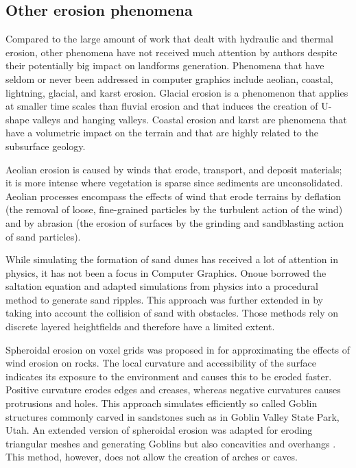\documentclass{article}
\begin{document}
\subsection{Other erosion phenomena}

Compared to the large amount of work that dealt with hydraulic and thermal erosion, other phenomena have not received much attention by authors despite their potentially big impact on landforms generation. Phenomena that have seldom or never been addressed in computer graphics include aeolian, coastal, lightning, glacial, and karst erosion. Glacial erosion is a phenomenon that applies at smaller time scales than fluvial erosion and that induces the creation of U-shape valleys and hanging valleys. Coastal erosion and karst are phenomena that have a volumetric impact on the terrain and that are highly related to the subsurface geology.

Aeolian erosion is caused by winds that erode, transport, and deposit materials; it is more intense where vegetation is sparse since sediments are unconsolidated. Aeolian processes encompass the effects of wind that erode terrains by deflation (the removal of loose, fine-grained particles by the turbulent action of the wind) and by abrasion (the erosion of surfaces by the grinding and sandblasting action of sand particles).

While simulating the formation of sand dunes has received a lot of attention in physics, it has not been a focus in Computer Graphics. Onoue \cite{ON00} borrowed the saltation equation and adapted simulations from physics into a procedural method to generate sand ripples. This approach was further extended in \cite{BR04} by taking into account the collision of sand with obstacles. Those methods rely on discrete layered heightfields and therefore have a limited extent.

Spheroidal erosion on voxel grids was proposed in \cite{BFO07, JFBB10} for approximating the effects of wind erosion on rocks. The local curvature and accessibility of the surface indicates its exposure to the environment and causes this to be eroded faster. Positive curvature erodes edges and creases, whereas negative curvatures causes protrusions and holes. This approach simulates efficiently so called Goblin structures commonly carved in sandstones such as in Goblin Valley State Park, Utah. An extended version of spheroidal erosion was adapted for eroding triangular meshes and generating Goblins but also concavities and overhangs \cite{TJ10}. This method, however, does not allow the creation of arches or caves.
\end{document}
